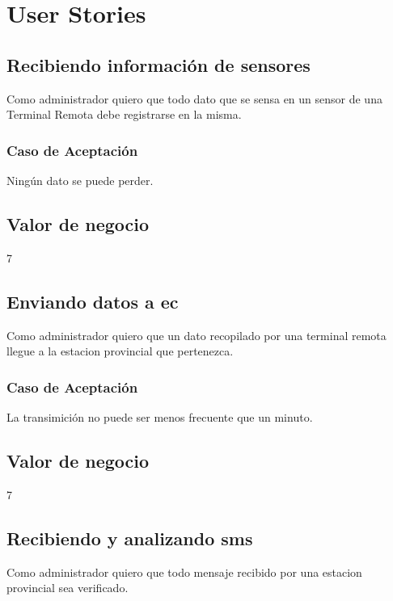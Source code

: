 
\thispagestyle{empty}

\vspace{4cm plus 1cm minus 1cm}

\section{User Stories}

\linea \subsection*{Recibiendo información de sensores}
Como administrador %
quiero que todo dato que se sensa en un sensor de una Terminal Remota debe registrarse en la misma.
\subsubsection*{Caso de Aceptación}
Ningún dato se puede perder.
\subsection*{Valor de negocio}
7

\linea \subsection*{Enviando datos a ec}
Como administrador quiero que un dato recopilado por una terminal remota llegue a la estacion provincial que pertenezca.
\subsubsection*{Caso de Aceptación}
La transimición no puede ser menos frecuente que un minuto.
\subsection*{Valor de negocio}
7

\linea \subsection*{Recibiendo y analizando sms}
Como administrador quiero que todo mensaje recibido por una estacion provincial sea verificado.
